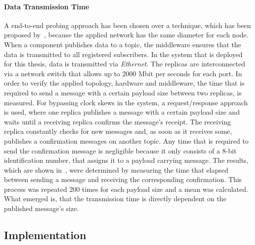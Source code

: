 \paragraph{Data Transmission Time}
A end-to-end probing approach has been chosen over a   technique, which has been proposed by~\cite{SinhaMeasureNetworkLatency}, because the applied network has the same diameter for each node.
When a component publishes data to a  topic, the middleware ensures that the data is transmitted to all registered subscribers.
In the system that is deployed for this thesis, data is transmitted via \textit{Ethernet}.
The replicas are interconnected via a network switch that allows up to 2000 Mbit per seconds for each port.
In order to verify the applied topology, hardware and middleware, the time that is required to send a message with a certain payload size between two replicas, is measured.
For bypassing clock skews in the system, a request/response approach is used, where one replica publishes a message with a certain payload size and waits until a receiving replica confirms the message's receipt.
The receiving replica constantly checks for new messages and, as soon as it receives some, publishes a confirmation messages on another topic.
Any time that is required to send the confirmation message is negligible because it only consists of a 8-bit identification number, that assigns it to a payload carrying message.
The results, which are shown in~\cite{fig:PlotSendingTimes}, were determined by measuring the time that elapsed between sending a message and receiving the corresponding confirmation.
This process was repeated 200 times for each payload size and a mean was calculated.
What emerged is, that the transmission time is directly dependent on the published message's size.

\subsection{Implementation}

